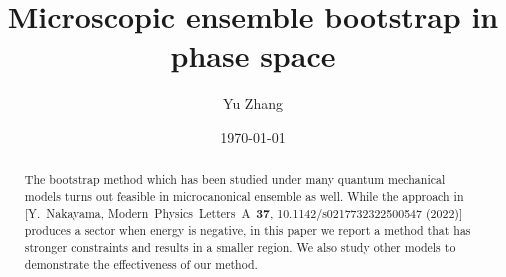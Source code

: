 \documentclass[aps, preprint,amsmath, amssymb]{revtex4-2}
\begin{document}

\title{Microscopic ensemble bootstrap in phase space}


\author{Yu Zhang}


\date{\today}

\begin{abstract}
    The bootstrap method which has been studied under many quantum mechanical models turns out feasible in microcanonical ensemble as well. While the approach in [Y.\ Nakayama, Modern\ Physics\ Letters\ A\ \textbf{37}, 10.1142/s0217732322500547 (2022)] produces a sector when energy is negative, in this paper we report a method that has stronger constraints and results in a smaller region. We also study other models to demonstrate the effectiveness of our method.
\end{abstract}

\end{document}
